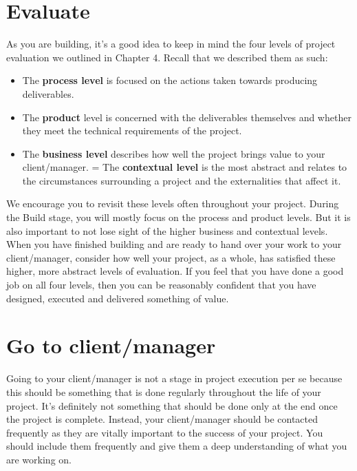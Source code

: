 \documentclass[
]{book}
\providecommand{\tightlist}{%
  \setlength{\itemsep}{0pt}\setlength{\parskip}{0pt}}
\begin{document}
\hypertarget{evaluate}{%
\section{Evaluate}\label{evaluate}}

As you are building, it's a good idea to keep in mind the four levels of project evaluation we outlined in Chapter 4. Recall that we described them as such:

\begin{itemize}
\tightlist
\item
  The \textbf{process level} is focused on the actions taken towards producing deliverables.
\item
  The \textbf{product} level is concerned with the deliverables themselves and whether they meet the technical requirements of the project.
\item
  The \textbf{business level} describes how well the project brings value to your client/manager.
  = The \textbf{contextual level} is the most abstract and relates to the circumstances surrounding a project and the externalities that affect it.
\end{itemize}

We encourage you to revisit these levels often throughout your project. During the Build stage, you will mostly focus on the process and product levels. But it is also important to not lose sight of the higher business and contextual levels. When you have finished building and are ready to hand over your work to your client/manager, consider how well your project, as a whole, has satisfied these higher, more abstract levels of evaluation. If you feel that you have done a good job on all four levels, then you can be reasonably confident that you have designed, executed and delivered something of value.

\hypertarget{go-to-clientmanager}{%
\section{Go to client/manager}\label{go-to-clientmanager}}

Going to your client/manager is not a stage in project execution per se because this should be something that is done regularly throughout the life of your project. It's definitely not something that should be done only at the end once the project is complete. Instead, your client/manager should be contacted frequently as they are vitally important to the success of your project. You should include them frequently and give them a deep understanding of what you are working on.
\end{document}
